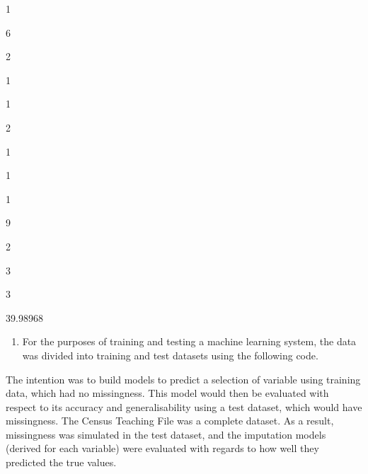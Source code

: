 \documentclass[]{book}
\newenvironment{Shaded}{\begin{snugshade}}{\end{snugshade}}
\newcommand{\KeywordTok}[1]{\textcolor[rgb]{0.13,0.29,0.53}{\textbf{#1}}}
\newcommand{\DataTypeTok}[1]{\textcolor[rgb]{0.13,0.29,0.53}{#1}}
\newcommand{\DecValTok}[1]{\textcolor[rgb]{0.00,0.00,0.81}{#1}}
\newcommand{\FloatTok}[1]{\textcolor[rgb]{0.00,0.00,0.81}{#1}}
\newcommand{\StringTok}[1]{\textcolor[rgb]{0.31,0.60,0.02}{#1}}
\newcommand{\CommentTok}[1]{\textcolor[rgb]{0.56,0.35,0.01}{\textit{#1}}}
\newcommand{\OtherTok}[1]{\textcolor[rgb]{0.56,0.35,0.01}{#1}}
\newcommand{\OperatorTok}[1]{\textcolor[rgb]{0.81,0.36,0.00}{\textbf{#1}}}
\newcommand{\NormalTok}[1]{#1}
\providecommand{\tightlist}{%
  \setlength{\itemsep}{0pt}\setlength{\parskip}{0pt}}
\begin{document}
1

6

2

1

1

2

1

1

1

9

2

3

3

39.98968

\begin{enumerate}
\def\labelenumi{\arabic{enumi})}
\setcounter{enumi}{1}
\tightlist
\item
  For the purposes of training and testing a machine learning system,
  the data was divided into training and test datasets using the
  following code.
\end{enumerate}

\begin{Shaded}
\end{Shaded}

The intention was to build models to predict a selection of variable
using training data, which had no missingness. This model would then be
evaluated with respect to its accuracy and generalisability using a test
dataset, which would have missingness. The Census Teaching File was a
complete dataset. As a result, missingness was simulated in the test
dataset, and the imputation models (derived for each variable) were
evaluated with regards to how well they predicted the true values.
\end{document}
